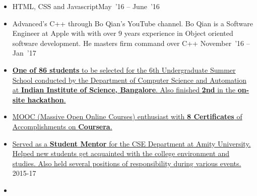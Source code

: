 \documentclass[10pt,a4paper]{article}
\begin{document}
\begin{itemize}[labelindent=1.5em,labelsep=-0.3cm,leftmargin=*]
\item \headedsubsection 
    {HTML, CSS and Javascript}{{{May~'16 -- June~'16}}}
    {}
    

\item \headedsubsection  %
  {{\normalfont Advanced's C++ through Bo Qian's YouTube channel. Bo Qian is a Software Engineer at Apple with with over 9 years experience in Object oriented software development. He masters firm command over C++ }}{{{November~'16 -- Jan~'17}}}
  
\end{itemize}


\spacedhrule{0.5em}{-0.4em}

\vspace{0.15cm}
\begin{itemize}[labelindent=1.5em,labelsep=-0.3cm,leftmargin=*]

\item \headedsubsection 
{\href{}{\normalfont \textbf{One of 86 students} to be selected for the 6th Undergraduate Summer School conducted by the Department of Computer Science and Automation at
\textbf{Indian Institute of Science, Bangalore}. Also finished \textbf{2nd} in the \textbf{on-site hackathon}. 
}}{{{}}}


\item \headedsubsection 
{\href{}{\normalfont MOOC (Massive Open Online Courses) enthusiast with \textbf{8 Certificates} of Accomplishments on \textbf{Coursera}.
}}{{{}}}

\item \headedsubsection 
{\href{}{\normalfont Served as a \textbf{Student Mentor} for the CSE Department at Amity University. Helped new students get acquainted with the college environment and studies. Also held several positions of responsibility during various events.
}}{{{ 2015-17}}}

\item {}

\end{itemize}
\end{document}
